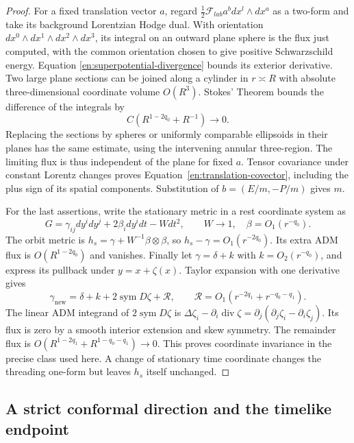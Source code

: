 \begin{proof}
For a fixed translation vector $a$, regard
$\tfrac12\mathcal F_{lab}a^b dx^l\wedge dx^a$ as a two-form and
take its background Lorentzian Hodge dual. With orientation
$dx^0\wedge dx^1\wedge dx^2\wedge dx^3$, its integral on an
outward plane sphere is the flux just computed, with the common
orientation chosen to give positive Schwarzschild energy. Equation
\ref{en:superpotential-divergence} bounds its exterior derivative.
Two large plane sections can be joined along a cylinder in
$r\asymp R$ with absolute three-dimensional coordinate volume
$O(R^3)$. Stokes' Theorem bounds the difference of the integrals by
\[
 C(R^{1-2q_0}+R^{-1})\longrightarrow0.
\]
Replacing the sections by spheres or uniformly comparable ellipsoids
in their planes has the same estimate, using the intervening annular
three-region. The limiting flux is thus independent of the plane for
fixed $a$. Tensor covariance under constant Lorentz changes proves
Equation~\ref{en:translation-covector}, including the plus sign of its
spatial components. Substitution of $b=(E/m,-P/m)$ gives $m$.

For the last assertions, write the stationary metric in a rest
coordinate system as
\[
 G=\gamma_{ij}dy^i dy^j+2\beta_i dy^i dt-Wdt^2,
 \qquad W\longrightarrow1,\quad\beta=O_1(r^{-q_0}).
\]
The orbit metric is $h_s=\gamma+W^{-1}\beta\otimes\beta$, so
$h_s-\gamma=O_1(r^{-2q_0})$. Its extra ADM flux is
$O(R^{1-2q_0})$ and vanishes. Finally let $\gamma=\delta+k$ with
$k=O_2(r^{-q_0})$, and express its pullback under $y=x+\zeta(x)$.
Taylor expansion with one derivative gives
\[
 \gamma_{\mathrm{new}}
 =\delta+k+2\operatorname{sym}D\zeta+\mathcal R,
 \qquad
 \mathcal R=O_1(r^{-2q_1}+r^{-q_0-q_1}).
\]
The linear ADM integrand of $2\operatorname{sym}D\zeta$ is
$\Delta\zeta_i-\partial_i\operatorname{div}\zeta
=\partial_j(\partial_j\zeta_i-\partial_i\zeta_j)$.
Its flux is zero by a smooth interior extension and skew symmetry.
The remainder flux is
$O(R^{1-2q_1}+R^{1-q_0-q_1})\to0$. This proves coordinate
invariance in the precise class used here. A change of stationary
time coordinate changes the threading one-form but leaves $h_s$
itself unchanged.
\end{proof}

\subsection{A strict conformal direction and the timelike endpoint}

